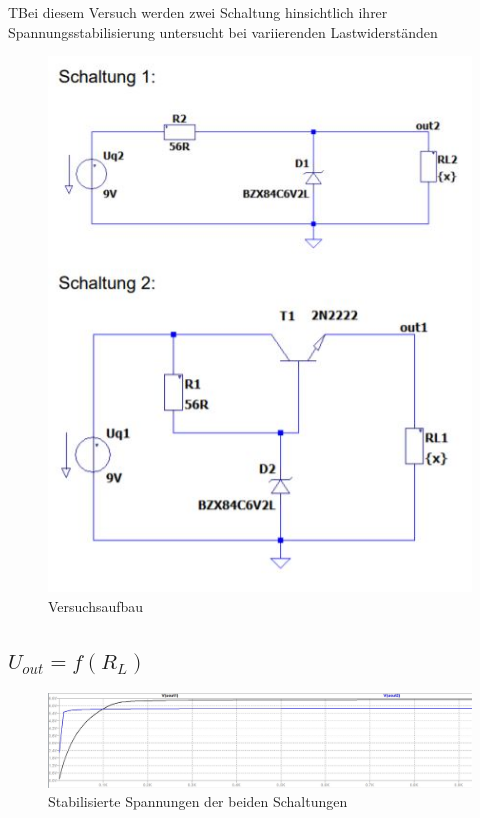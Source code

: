 \documentclass{article}
\begin{document}
\begin{task}
  TBei diesem Versuch werden zwei Schaltung hinsichtlich ihrer Spannungsstabilisierung untersucht bei variierenden Lastwiderständen 
\end{task}

\begin{figure}[h]
  \centering
  \includegraphics[scale=0.8]{../assets/images/EL1P3/schaltung 3.JPG}
  \caption{Versuchsaufbau}
\end{figure}

\subsection{$U_{out} = f (R_L)$}
\begin{figure}[h]
  \centering
  \includegraphics[scale=0.4]{../assets/images/EL1P3/aufgabe 3 u messung.JPG}
  \caption{Stabilisierte Spannungen der beiden Schaltungen}
\end{figure}
\end{document}
